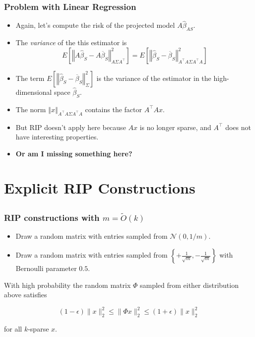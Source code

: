 \documentclass[aspectratio=34]{beamer}
\theoremstyle{plain}
\begin{document}
\begin{frame}
\frametitle{Problem with Linear Regression}
\begin{itemize}
    \item Again, let's compute the risk of the projected model $A\widehat{\beta}_{AS}$.
    \item The \emph{variance} of the this estimator is
\[
E\left[\left\Vert A\widehat{\beta}_{S}-A\overline{\beta}_{S}\right\Vert _{A\Sigma A^{\top}}^{2}\right]=E\left[\left\Vert \widehat{\beta}_{S}-\overline{\beta}_{S}\right\Vert _{A^{\top}A\Sigma A^{\top}A}^{2}\right]
\]
    \item The term $E\left[\left\Vert \widehat{\beta}_{S}-\overline{\beta}_{S}\right\Vert _{\Sigma}^{2}\right]$ is the variance of the estimator in the high-dimensional space $\widehat{\beta}_S$.
    \item The norm $\left\Vert x \right\Vert_{A^\top A \Sigma A^\top A}$ contains the factor $A^\top Ax$.
    \item But RIP doesn't apply here because $Ax$ is no longer sparse, and $A^\top$ does not have interesting properties.
    \item \textbf{Or am I missing something here?}
\end{itemize}
\end{frame}

\section{Explicit RIP Constructions}

\subsection{}
\begin{frame}
\frametitle{RIP constructions with $m = \tilde{O}(k)$}

\begin{itemize}
\item Draw a random matrix with entries sampled from $\mathcal{N}(0,1/m)$.

\item Draw a random matrix with entries sampled from $\left\{+\frac{1}{\sqrt{m}}, -\frac{1}{\sqrt{m}}\right\}$ with Bernoulli parameter $0.5$. 
\end{itemize}
\begin{theorem}
	With high probability the random matrix $\Phi$ sampled from either distribution above satisfies 
	
	\[(1-\epsilon)\|x\|_2^2 \le \|\Phi x\|_2^2 \le (1+\epsilon)\|x\|_2^2\]
	
	for all $k$-sparse $x$.
\end{theorem}

\end{frame}
\end{document}
